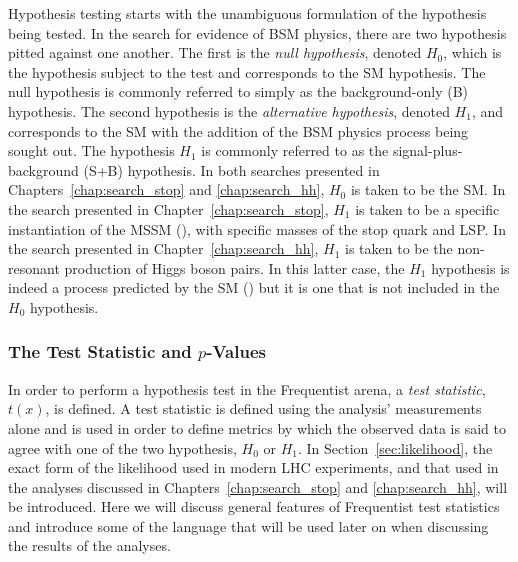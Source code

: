 Hypothesis testing starts with the unambiguous formulation of the hypothesis being
tested.
In the search for evidence of BSM physics, there are two hypothesis pitted
against one another.
The first is the \textit{null hypothesis}, denoted $H_0$, which is the hypothesis
subject to the test and corresponds to the SM hypothesis. The null hypothesis is commonly
referred to simply as the background-only (B) hypothesis.
The second hypothesis is the \textit{alternative hypothesis}, denoted $H_1$, and corresponds
to the SM with the addition of the BSM physics process being sought out.
The hypothesis $H_1$ is commonly referred to as the signal-plus-background (S+B) hypothesis.
In both searches presented in Chapters~\ref{chap:search_stop} and \ref{chap:search_hh},
$H_0$ is taken to be the SM.
In the search presented in Chapter~\ref{chap:search_stop}, $H_1$ is taken to be a specific
instantiation of the MSSM ({\color{red}{Section XXX}}), with specific masses of the
stop quark and LSP.
In the search presented in Chapter~\ref{chap:search_hh}, $H_1$ is taken to be the
non-resonant production of Higgs boson pairs.
In this latter case, the $H_1$ hypothesis is indeed a process predicted by the SM ({\color{red}{SECTION XXX about HH pheno and EWSB}}) but
it is one that is not included in the $H_0$ hypothesis.

%
%
\subsubsection{The Test Statistic and $p$-Values}

In order to perform a hypothesis test in the Frequentist arena, a \textit{test statistic}, $t(x)$,
is defined.
A test statistic is defined using the analysis' measurements alone and is
used in order to define metrics by which the observed data is said to agree with
one of the two hypothesis, $H_0$ or $H_1$.
In Section~\ref{sec:likelihood}, the exact form of the likelihood used in modern LHC experiments,
and that used in the analyses discussed in Chapters~\ref{chap:search_stop} and \ref{chap:search_hh},
will be introduced.
Here we will discuss general features of Frequentist test statistics and introduce
some of the language that will be used later on when discussing the results of the
analyses.

